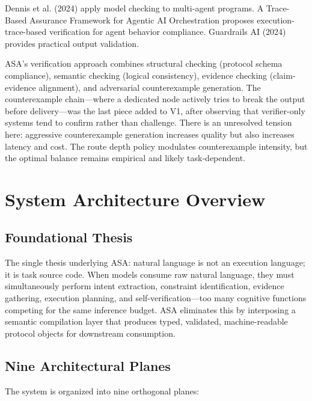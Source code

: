 \documentclass[12pt,a4paper]{article}
\begin{document}
Dennis et al. (2024) apply model checking to multi-agent programs. A Trace-Based Assurance Framework for Agentic AI Orchestration \cite{ref17} proposes execution-trace-based verification for agent behavior compliance. Guardrails AI (2024) provides practical output validation.

ASA's verification approach combines structural checking (protocol schema compliance), semantic checking (logical consistency), evidence checking (claim-evidence alignment), and adversarial counterexample generation. The counterexample chain---where a dedicated node actively tries to break the output before delivery---was the last piece added to V1, after observing that verifier-only systems tend to confirm rather than challenge. There is an unresolved tension here: aggressive counterexample generation increases quality but also increases latency and cost. The route depth policy modulates counterexample intensity, but the optimal balance remains empirical and likely task-dependent.

\section{System Architecture Overview}


\subsection{Foundational Thesis}


The single thesis underlying ASA: natural language is not an execution language; it is task source code. When models consume raw natural language, they must simultaneously perform intent extraction, constraint identification, evidence gathering, execution planning, and self-verification---too many cognitive functions competing for the same inference budget. ASA eliminates this by interposing a semantic compilation layer that produces typed, validated, machine-readable protocol objects for downstream consumption.

\subsection{Nine Architectural Planes}


The system is organized into nine orthogonal planes:
\end{document}
